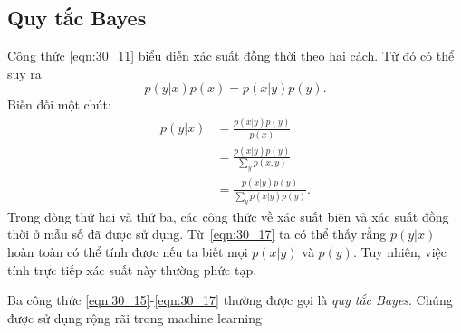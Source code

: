 \subsection{Quy tắc Bayes}
Công thức \eqref{eqn:30_11} biểu diễn xác suất đồng thời theo hai cách. Từ đó có thể suy ra
\begin{equation}
p(y |x) p(x) = p(x | y) p(y).
\end{equation}
Biến đối một chút:
\begin{align}
\label{eqn:30_15}
p(y | x)
& =  \frac{p(x |y) p(y)}{p(x)} \\
\label{eqn:30_16}
& =  \frac{p(x |y) p(y)}{\sum \limits_{y} p(x, y)} \\
\label{eqn:30_17}
& =  \frac{p(x |y) p(y)}{\sum \limits_{y} p(x | y) p(y)}.
\end{align}
Trong dòng thứ hai và thứ ba, các công thức về xác suất biên và xác suất đồng thời
ở mẫu số đã được sử dụng. Từ~\eqref{eqn:30_17} ta có thể thấy rằng $p(y | x)$
hoàn toàn có thể tính được nếu ta biết mọi $p(x | y)$ và $p(y)$. Tuy nhiên, việc
tính trực tiếp xác suất này thường phức tạp.


{Ba công thức \eqref{eqn:30_15}-\eqref{eqn:30_17} thường được gọi là \textit{quy
tắc Bayes}. Chúng được sử dụng rộng rãi trong machine learning}




